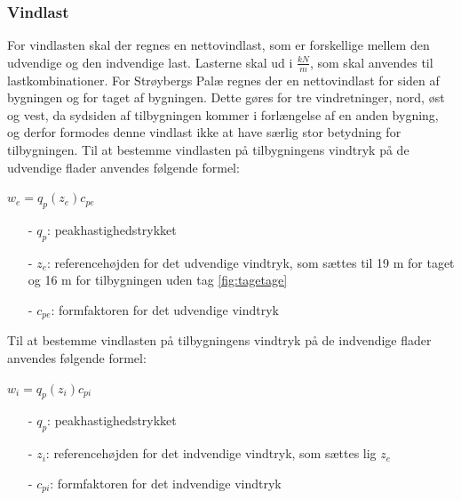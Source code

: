\subsubsection{Vindlast}
For vindlasten skal der regnes en nettovindlast, som er forskellige mellem den udvendige og den indvendige last. Lasterne skal ud i $\frac{kN}{m}$, som skal anvendes til lastkombinationer.
\newline \indent{     }  For Strøybergs Palæ regnes der en nettovindlast for siden af bygningen og for taget af bygningen. Dette gøres for tre vindretninger, nord, øst og vest, da sydsiden af tilbygningen kommer i forlængelse af en anden bygning, og derfor formodes denne vindlast ikke at have særlig stor betydning for tilbygningen.
\newline
\newline
Til at bestemme vindlasten på tilbygningens vindtryk på de udvendige flader anvendes følgende formel:	
\begin{center} 
	$w_e=q_p(z_e)c_{pe}$
\end{center}
\begin{itemize}
	\item[-] $q_p$: peakhastighedstrykket
	\item[-] $z_e$: referencehøjden for det udvendige vindtryk, som sættes til 19 m for taget og 16 m for tilbygningen uden tag \ref{fig:tagetage}
	\item[-] $c_{pe}$: formfaktoren for det udvendige vindtryk
\end{itemize}

Til at bestemme vindlasten på tilbygningens vindtryk på de indvendige flader anvendes følgende formel:
\begin{center} 
	$w_i=q_p(z_i)c_{pi}$
\end{center}
\begin{itemize}
	\item[-] $q_p$: peakhastighedstrykket
	\item[-] $z_i$: referencehøjden for det indvendige vindtryk, som sættes lig $z_e$ \citep[ kapitel 7.2.9]{EU91}
	\item[-] $c_{pi}$: formfaktoren for det indvendige vindtryk
\end{itemize}

